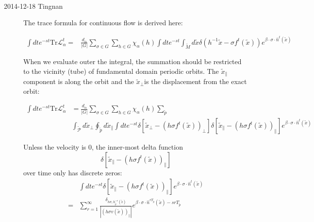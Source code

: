 \begin{description}
\item[2014-12-18 Tingnan]

The trace formula for continuous flow is derived here:

\begin{align*}
\int dte^{-st}\mathrm{Tr}\mathcal{L}_{\alpha}^{t}= & \frac{d_{\alpha}}{\vert G\vert}\sum_{\sigma\in G}\sum_{h\in G}\chi_{\alpha}(h)\int dte^{-st}\int_{\tilde{M}}d\tilde{x}\delta(h^{-1}\tilde{x}-\sigma f^{t}(\tilde{x}))e^{\beta\cdot\sigma\cdot\hat{n}^{t}(\tilde{x})}
\end{align*}


When we evaluate outer the integral, the summation should be restricted
to the vicinity (tube) of fundamental domain periodic orbits. The
$\tilde{x}_{\parallel}$ component is along the orbit and the $\tilde{x}_{\perp}$is
the displacement from the exact orbit:

\begin{align*}
\int dte^{-st}\mathrm{Tr}\mathcal{L}_{\alpha}^{t} & =\frac{d_{\alpha}}{\vert G\vert}\sum_{\sigma\in G}\sum_{h\in G}\chi_{\alpha}(h)\sum_{\tilde{p}}\\
&\int_{\tilde{\mathcal{P}}}d\tilde{x}_{\perp}\oint_{\tilde{p}}d\tilde{x}_{\parallel}\int dte^{-st}\delta\left[\tilde{x}_{\perp}-\left(h\sigma f^{t}(\tilde{x})\right)_{\perp}\right]\delta\left[\tilde{x}_{\parallel}-\left(h\sigma f^{t}(\tilde{x})\right)_{\parallel}\right]e^{\beta\cdot\sigma\cdot\hat{n}^{t}(\tilde{x})}
\end{align*}


Unless the velocity is $0$, the
inner-most delta function
\[
\delta\left[\tilde{x}_{\parallel}-\left(h\sigma f^{t}(\tilde{x})\right)_{\parallel}\right]
\]
 over time only has discrete zeros:
\begin{align*}
 & \int dte^{-st}\delta\left[\tilde{x}_{\parallel}-\left(h\sigma f^{t}(\tilde{x})\right)_{\parallel}\right]e^{\beta\cdot\sigma\cdot\hat{n}^{t}(\tilde{x})}\\
= & \sum_{r=1}^{\infty}\frac{\delta_{h\sigma,h_{\tilde{p}}^{-r}(\tilde{x})}}{\left|\left(h\sigma v(\tilde{x})\right)_{\parallel}\right|}e^{\beta\cdot\sigma\cdot\hat{n}^{rT_{\tilde{p}}}(\tilde{x})-srT_{\tilde{p}}}
\end{align*}



\end{description}
